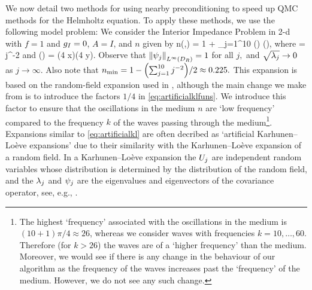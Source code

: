 We now detail two methods for using nearby preconditioning to speed up QMC methods for the Helmholtz equation. To apply these methods, we use the following model problem: We consider the Interior Impedance Problem in 2-d with $f=1$ and $g_{I}=0$, $A = I$, and $n$ given by
\beq\label{eq:artificialkl}
n(\omega,\bx) = 1 + \sum_{j=1}^{10} \Uj(\omega) \sqrt{\lambdaj} \psij(\bx),
\eeq
where
\beq\label{eq:artificialkllambdas}
\sqrt{\lambdaj} = j^{-2}
\eeq
and
\beq\label{eq:artificialklfuns}
\psij(\bx) = \cos\mleft(4 x\mright)\cos\mleft(4 y\mright).
\eeq
Observe that $\NLiDR{\psij}=1$ for all $j,$ and $\sqrt{\lambda_{j}} \rightarrow 0$ as $j \rightarrow \infty.$ Also note that $\nmin = 1 - \mleft(\sum_{j=1}^{10} j^{-2}\mright)/2 \approx 0.225.$ This expansion is based on the random-field expansion used in \cite[Section 5.1]{GiGrKuScSl:19}, although the main change we make from \cite{GiGrKuScSl:19} is to introduce the factors $1/4$ in \cref{eq:artificialklfuns}. We introduce this factor to ensure that the oscillations in the medium $n$ are `low frequency' compared to the frequency $k$ of the waves passing through the medium\footnote{The highest `frequency' associated with the oscillations in the medium is $(10+1)\pi/4 \approx 26$, whereas we consider waves with frequencies $k=10,\ldots,60$. Therefore (for $k > 26$) the waves are of a `higher frequency' than the medium. Moreover, we would see if there is any change in the behaviour of our algorithm as the frequency of the waves increases past the `frequency' of the medium. However, we do not see any such change.}. Expansions similar to \cref{eq:artificialkl} are often decribed as `artificial Karhunen--Lo\`eve expansions' due to their similarity with the Karhunen--Lo\`eve expansion of a random field. In a Karhunen--Lo\`eve expansion the $U_{j}$ are independent random variables whose distribution is determined by the distribution of the random field, and the $\lambda_{j}$ and $\psi_{j}$ are the eigenvalues and eigenvectors of the covariance operator, see, e.g., \cite[Section 7.4]{LoPoSh:14}.

